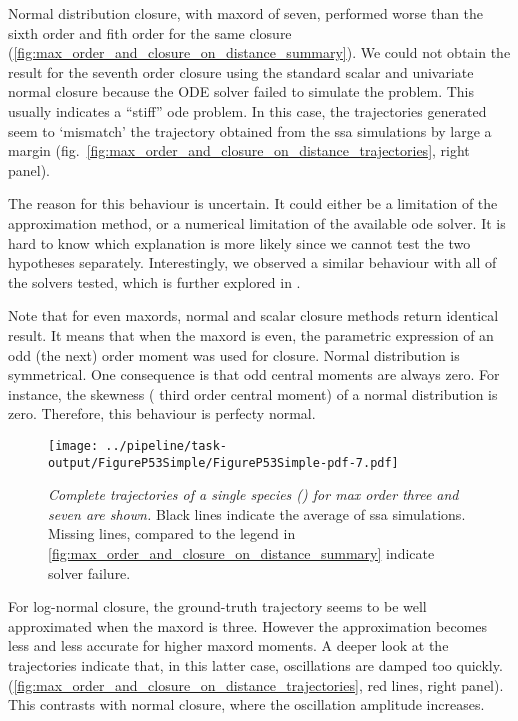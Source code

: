 Normal distribution closure, with \gls{maxord} of seven, performed worse than the sixth order and fith order for the same closure (\autoref{fig:max_order_and_closure_on_distance_summary}).
We could not obtain the result for the seventh order closure using the standard scalar and univariate normal closure
because the ODE solver failed to simulate the problem.
This usually indicates a ``stiff'' \gls{ode} problem\cite{hairer_solving_1996}.
In this case, the trajectories generated seem to `mismatch' the trajectory obtained from the \gls{ssa} simulations by
large a margin (fig.~\autoref{fig:max_order_and_closure_on_distance_trajectories}, right panel).

The reason for this behaviour is uncertain. It could either be a limitation of the approximation method, or a numerical limitation of the available \gls{ode} solver.
It is hard to know which explanation is more likely since we cannot test the two hypotheses separately.
Interestingly, we observed a similar behaviour with all of the solvers tested, which is further explored in .

Note that for even \glspl{maxord}, normal and scalar closure methods return identical result.
It means that when the \gls{maxord} is even,  the parametric expression of an odd (the next) order moment was used for closure.
Normal distribution is symmetrical. One consequence is that odd central moments are always zero.
For instance, the skewness (\ie{} third order central moment) of a normal distribution is zero.
Therefore, this behaviour is perfecty normal.



\begin{figure}
    \centering
    \texttt{[image: ../pipeline/task-output/FigureP53Simple/FigureP53Simple-pdf-7.pdf]}
    \caption{\emph{Complete trajectories of a single species (\pft) for max order three and seven are shown.} 
    Black lines indicate the average of \gls{ssa} simulations. 
    Missing lines, compared to the legend in \autoref{fig:max_order_and_closure_on_distance_summary} indicate solver failure.}
    \label{fig:max_order_and_closure_on_distance_trajectories}
\end{figure}

 
For log-normal closure, the ground-truth trajectory seems to be well approximated when the \gls{maxord} is three.
However the approximation becomes less and less accurate for higher \gls{maxord} moments.
A deeper look at the trajectories indicate that, in this latter case,
oscillations are damped too quickly. (\autoref{fig:max_order_and_closure_on_distance_trajectories}, red lines, right panel).
This contrasts with normal closure, where the oscillation amplitude increases.

